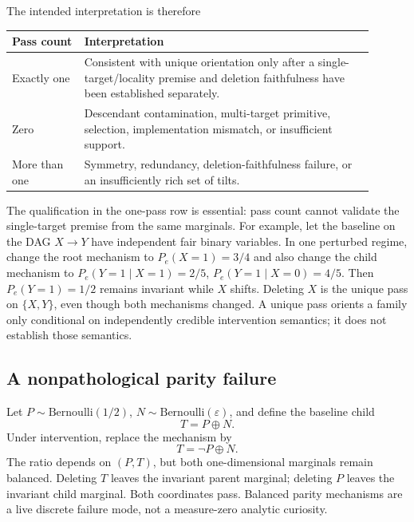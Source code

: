 \documentclass[11pt]{article}
\newcommand{\eps}{\varepsilon}
\begin{document}
The intended interpretation is therefore
\begin{center}
\begin{tabular}{p{0.18\linewidth}p{0.72\linewidth}}
\toprule
Pass count & Interpretation \\
\midrule
Exactly one & Consistent with unique orientation only after a single-target/locality premise and deletion faithfulness have been established separately. \\
Zero & Descendant contamination, multi-target primitive, selection, implementation mismatch, or insufficient support. \\
More than one & Symmetry, redundancy, deletion-faithfulness failure, or an insufficiently rich set of tilts. \\
\bottomrule
\end{tabular}
\end{center}

The qualification in the one-pass row is essential: pass count cannot validate the single-target premise from the same marginals.  For example, let the baseline on the DAG \(X\to Y\) have independent fair binary variables.  In one perturbed regime, change the root mechanism to \(P_e(X=1)=3/4\) and also change the child mechanism to \(P_e(Y=1\mid X=1)=2/5\), \(P_e(Y=1\mid X=0)=4/5\).  Then \(P_e(Y=1)=1/2\) remains invariant while \(X\) shifts.  Deleting \(X\) is the unique pass on \(\{X,Y\}\), even though both mechanisms changed.  A unique pass orients a family only conditional on independently credible intervention semantics; it does not establish those semantics.

\subsection{A nonpathological parity failure}\label{sec:parity-placeholder}

Let \(P\sim\mathrm{Bernoulli}(1/2)\), \(N\sim\mathrm{Bernoulli}(\eps)\), and define the baseline child
\begin{equation}
T=P\oplus N.
\end{equation}
Under intervention, replace the mechanism by
\begin{equation}
T=\neg P\oplus N.
\end{equation}
The ratio depends on \((P,T)\), but both one-dimensional marginals remain balanced.  Deleting \(T\) leaves the invariant parent marginal; deleting \(P\) leaves the invariant child marginal.  Both coordinates pass.  Balanced parity mechanisms are a live discrete failure mode, not a measure-zero analytic curiosity.
\end{document}
